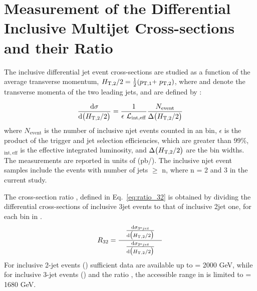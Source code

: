 \chapter{Measurement of the Differential Inclusive Multijet Cross-sections and their Ratio}
\label{chap:Measurement}
The inclusive differential jet event cross-sections are studied as a function of the average transverse momentum, $\httwo = \frac{1}{2}(\ptone\plus \pttwo)$, where \ptone and \pttwo denote the transverse momenta of the two leading jets, and are defined by :

\begin{equation}
 \label{eq:inclusive_formula}
 {\dd{\sigma}{\big(\httwo\big)}} = \frac{1}{\epsilon~\lumi_{\mathrm{int,eff}}}\frac{N_\mathrm{event}}{\Delta\big(\httwo\big)}
\end{equation}
where $N_\mathrm{event}$ is the number of inclusive n\hy jet events counted in an \httwo bin, $\epsilon$ is the product of the trigger and jet selection efficiencies, which are greater than 99\%, \lumins$_{\mathrm{int,eff}}$ is the effective integrated luminosity, and $ \Delta\big(H_{\mathrm{T,2}}/2\big)$ are the bin widths. The measurements are reported in units of (pb/\GeV). The inclusive n\hy jet event samples include the events with number of jets $\geq$ n, where n = 2 and 3 in the current study. 

The cross-section ratio \rations, defined in Eq.~\ref{eq:ratio_32} is obtained by dividing the differential cross-sections of inclusive 3\hy jet events to that of inclusive 2\hy jet one, for each bin in \httwo.
\begin{equation}
 \label{eq:ratio_32}
 \ratio = \frac[10pt]{{\dd{\sigma_{3\hy jet}}{\big(\httwo\big)}}}{\dd{\sigma_{2\hy jet}}{\big(\httwo\big)}}
\end{equation}
For inclusive 2-jet events (\njt) sufficient data are available up to \httwo = 2000 GeV, while for inclusive 3-jet events (\njth) and the ratio \rations, the accessible range in \httwo is limited to \httwo = 1680 GeV.

